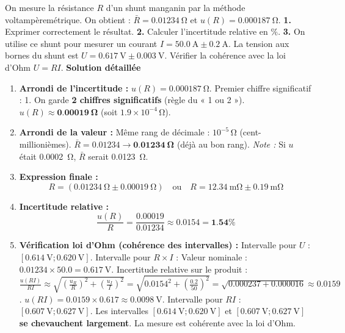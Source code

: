 \documentclass[11pt]{article}
\begin{document}
\begin{exoresolu}
    On mesure la résistance $R$ d'un shunt manganin par la méthode voltampèremétrique. On obtient : $\bar{R} = \SI{0,01234}{\ohm}$ et $u(R) = \SI{0,000187}{\ohm}$.
    \textbf{1.} Exprimer correctement le résultat.
    \textbf{2.} Calculer l'incertitude relative en $\%$.
    \textbf{3.} On utilise ce shunt pour mesurer un courant $I = \SI{50,0}{\ampere} \pm \SI{0,2}{\ampere}$. La tension aux bornes du shunt est $U = \SI{0,617}{\volt} \pm \SI{0,003}{\volt}$. Vérifier la cohérence avec la loi d'Ohm $U = RI$.
    \tcblower
    \textbf{Solution détaillée}
    \begin{enumerate}
        \item \textbf{Arrondi de l'incertitude :} $u(R) = \SI{0,000187}{\ohm}$. Premier chiffre significatif : 1. On garde \textbf{2 chiffres significatifs} (règle du « 1 ou 2 »).
              $u(R) \approx \mathbf{\SI{0,00019}{\ohm}}$ (soit $\num{1,9} \times 10^{-4}\,\si{\ohm}$).
        \item \textbf{Arrondi de la valeur :} Même rang de décimale : $10^{-5}\,\si{\ohm}$ (cent-millionièmes).
              $\bar{R} = \num{0,01234} \to \mathbf{\SI{0,01234}{\ohm}}$ (déjà au bon rang).
              \emph{Note :} Si $u$ était \SI{0,0002}{\ohm}, $\bar{R}$ serait \SI{0,0123}{\ohm}.
        \item \textbf{Expression finale :}
              \[ \boxed{R = (\SI{0,01234}{\ohm} \pm \SI{0,00019}{\ohm})} \quad \text{ou} \quad \boxed{R = \SI{12,34}{\milli\ohm} \pm \SI{0,19}{\milli\ohm}} \]
        \item \textbf{Incertitude relative :}
              \[ \frac{u(R)}{R} = \frac{\num{0,00019}}{\num{0,01234}} \approx \num{0,0154} = \mathbf{\num{1,54}\%} \]
        \item \textbf{Vérification loi d'Ohm (cohérence des intervalles) :}
              Intervalle pour $U$ : $[\SI{0,614}{\volt} ; \SI{0,620}{\volt}]$.
              Intervalle pour $R \times I$ :
              Valeur nominale : $\num{0,01234} \times \num{50,0} = \SI{0,617}{\volt}$.
              Incertitude relative sur le produit : $\frac{u(RI)}{RI} \approx \sqrt{ \left(\frac{u_R}{R}\right)^2 + \left(\frac{u_I}{I}\right)^2 } = \sqrt{\num{0,0154}^2 + \left(\frac{\num{0,2}}{\num{50}}\right)^2 } = \sqrt{\num{0,000237} + \num{0,000016}} \approx \num{0,0159}$.
              $u(RI) = \num{0,0159} \times \num{0,617} \approx \SI{0,0098}{\volt}$.
              Intervalle pour $RI$ : $[\SI{0,607}{\volt} ; \SI{0,627}{\volt}]$.
              Les intervalles $[\SI{0,614}{\volt} ; \SI{0,620}{\volt}]$ et $[\SI{0,607}{\volt} ; \SI{0,627}{\volt}]$ \textbf{se chevauchent largement}. La mesure est cohérente avec la loi d'Ohm.
    \end{enumerate}
\end{exoresolu}
\end{document}
